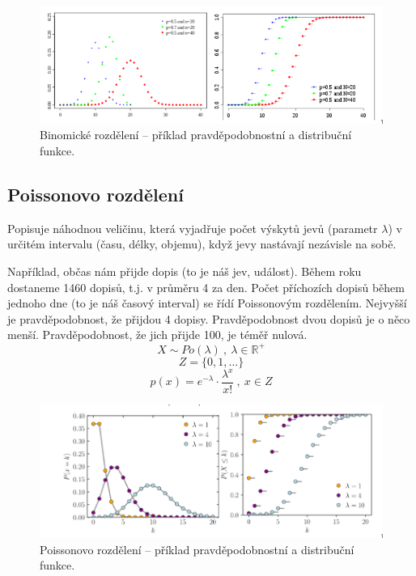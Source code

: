 \begin{figure}[H]
    \centering
    \includegraphics[width=1\linewidth]{dnp_binomicke.png}
    \caption{Binomické rozdělení -- příklad pravděpodobnostní a distribuční funkce.}
\end{figure}

\subsection{Poissonovo rozdělení}

\begin{compactitem}
    \item Popisuje náhodnou veličinu, která vyjadřuje počet výskytů jevů (parametr $\lambda$) v určitém intervalu (času, délky, objemu), když jevy nastávají nezávisle na sobě.
    \item Například, občas nám přijde dopis (to je náš jev, událost). Během roku dostaneme 1460 dopisů, t.j. v průměru 4 za den. Počet příchozích dopisů během jednoho dne (to je náš časový interval) se řídí Poissonovým rozdělením. Nejvyšší je pravděpodobnost, že přijdou 4 dopisy. Pravděpodobnost dvou dopisů je o něco menší. Pravděpodobnost, že jich přijde 100, je téměř nulová.
    $$ X \sim Po(\lambda) ~,~ \lambda \in \mathbb{R}^+ $$
    $$ Z = \{ 0, 1, \ldots \}$$
    $$ p(x) = e^{- \lambda} \cdot \frac{\lambda^x}{x!} ~,~ x \in Z $$
\end{compactitem}

\begin{figure}[H]
    \centering
    \includegraphics[width=1\linewidth]{dnp_poissonovo.png}
    \caption{Poissonovo rozdělení -- příklad pravděpodobnostní a distribuční funkce.}
\end{figure}

